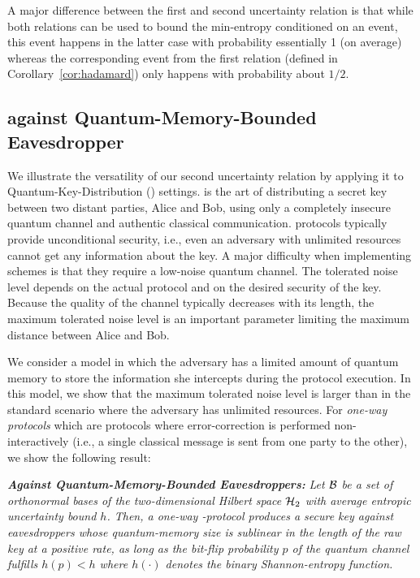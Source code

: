 A major difference between the first and second uncertainty relation
is that while both relations can be used to bound the min-entropy
conditioned on an event, this event happens in the latter case with
probability essentially 1 (on average) whereas the corresponding event
from the first relation (defined in Corollary~\ref{cor:hadamard}) only
happens with probability about $1/2$.


\subsection{\QKD against Quantum-Memory-Bounded Eavesdropper}
We illustrate the versatility of our second uncertainty relation by
applying it to Quantum-Key-Distribution (\QKD) settings.  \QKD is the
art of distributing a secret key between two distant parties, Alice
and Bob, using only a completely insecure quantum channel and
authentic classical communication. \QKD protocols typically provide
unconditional security, i.e., even an
adversary with unlimited resources cannot get any information about
the key.  A major difficulty when implementing \QKD schemes is that
they require a low-noise quantum channel.  The tolerated noise level
depends on the actual protocol and on the desired security of the key.
Because the quality of the channel typically decreases with its
length, the maximum tolerated noise level is an important parameter
limiting the maximum distance between Alice and Bob.

We consider a model in which the adversary has a limited amount of
quantum memory to store the information she intercepts during the
protocol execution. In this model, we show that the maximum
tolerated noise level is larger than in the standard scenario where
the adversary has unlimited resources.  
For {\em one-way \QKD protocols} which are protocols where error-correction is
performed non-interactively (i.e., a single classical message is sent
from one party to the other), we show the following result:

\medskip
\noindent
{\bf {\em \QKD Against Quantum-Memory-Bounded Eavesdroppers:}} {\em Let
  $\mathcal{B}$ be a set of orthonormal bases of the two-dimensional Hilbert space $\mathcal{H}_2$ with average entropic
  uncertainty bound $h$. Then, a \emph{one-way \QKD-protocol} produces
  a secure key against eavesdroppers whose quantum-memory size is
  sublinear in the length of the raw key at a positive rate, as long as
  the bit-flip probability $p$ of the quantum channel fulfills $h(p)
  < h $ where $h(\cdot)$ denotes the binary Shannon-entropy
  function.  } \medskip

